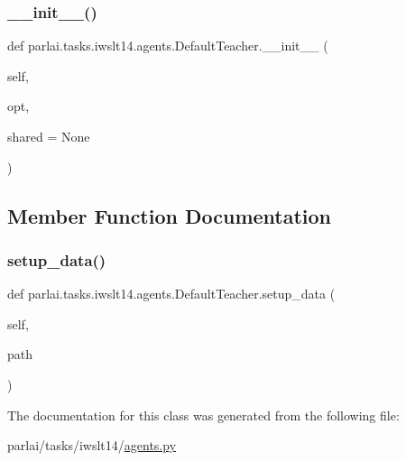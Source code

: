 \subsubsection{\texorpdfstring{\+\_\+\+\_\+init\+\_\+\+\_\+()}{\_\_init\_\_()}}
{\footnotesize\ttfamily def parlai.\+tasks.\+iwslt14.\+agents.\+Default\+Teacher.\+\_\+\+\_\+init\+\_\+\+\_\+ (\begin{DoxyParamCaption}\item[{}]{self,  }\item[{}]{opt,  }\item[{}]{shared = {\ttfamily None} }\end{DoxyParamCaption})}



\subsection{Member Function Documentation}
\mbox{\label{classparlai_1_1tasks_1_1iwslt14_1_1agents_1_1DefaultTeacher_a3294d31a37e9260469383275154df900}} 
\subsubsection{\texorpdfstring{setup\+\_\+data()}{setup\_data()}}
{\footnotesize\ttfamily def parlai.\+tasks.\+iwslt14.\+agents.\+Default\+Teacher.\+setup\+\_\+data (\begin{DoxyParamCaption}\item[{}]{self,  }\item[{}]{path }\end{DoxyParamCaption})}



The documentation for this class was generated from the following file\+:\begin{DoxyCompactItemize}
\item 
parlai/tasks/iwslt14/\hyperlink{parlai_2tasks_2iwslt14_2agents_8py}{agents.\+py}\end{DoxyCompactItemize}
